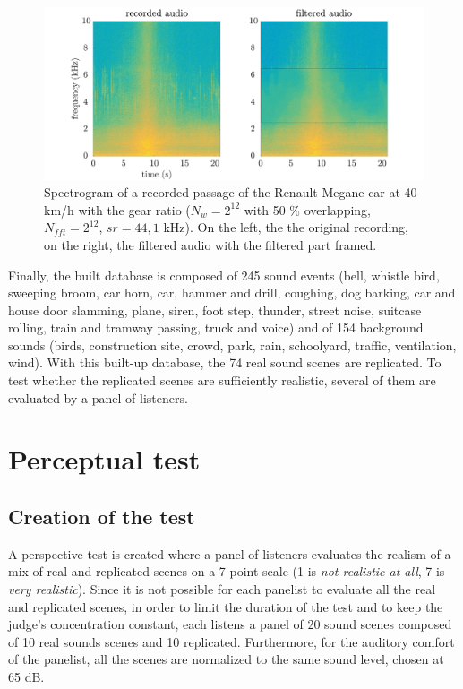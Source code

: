 \documentclass[a4,11pt,twocolumn]{article}
\begin{document}
\begin{figure}[hbtp]
\centering
\includegraphics[width=\linewidth]{./pictures/filtrageMedian_VL1_R3_40_EN.pdf}
\caption{Spectrogram of a recorded passage of the Renault Megane car at 40 km/h with the  gear ratio ($N_{w} = 2^{12}$ with 50 $\%$ overlapping, $N_{fft} = 2^{12}$, $sr = 44,1$ kHz). On the left, the the original recording, on the right, the filtered audio with the filtered part framed.}
\label{fig:filtre_car}
\end{figure}

Finally, the built database is composed of 245 sound events (bell, whistle bird, sweeping broom, car horn, car, hammer and drill, coughing, dog barking, car and house door slamming, plane, siren, foot step, thunder, street noise, suitcase rolling, train and tramway passing, truck and voice) and of 154 background sounds (birds, construction site, crowd, park, rain, schoolyard, traffic, ventilation, wind). With this built-up database, the 74 real sound scenes are replicated. To test whether the replicated scenes are sufficiently realistic, several of them are evaluated by a panel of listeners.

\section{Perceptual test}
\subsection{Creation of the test}
A perspective test is created where a panel of listeners evaluates the realism of a mix of real and replicated scenes on a 7-point scale (1 is \textit{not realistic at all}, 7 is \textit{very realistic}). Since it is not possible for each panelist to evaluate all the real and replicated scenes, in order to limit the duration of the test and to keep the judge's concentration constant, each listens a panel of 20 sound scenes composed of 10 real sounds scenes and 10 replicated. Furthermore, for the auditory comfort of the panelist, all the scenes are normalized to the same sound level, chosen at 65 dB.\\
\end{document}

